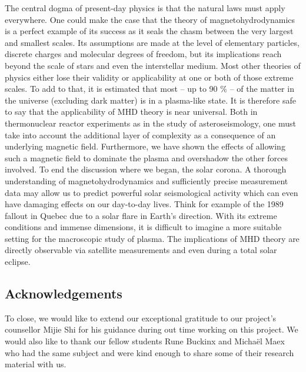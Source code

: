 The central dogma of present-day physics is that the natural laws must apply everywhere. One could make the case that the theory of magnetohydrodynamics is a perfect example of its success as it seals the chasm between the very largest and smallest scales. Its assumptions are made at the level of elementary particles, discrete charges and molecular degrees of freedom, but its implications reach beyond the scale of stars and even the interstellar medium. Most other theories of physics either lose their validity or applicability at one or both of those extreme scales.
To add to that, it is estimated that most – up to 90 $\%$ \citep{notes-principles-MHD}– of the matter in the universe (excluding dark matter) is in a plasma-like state. It is therefore safe to say that the applicability of MHD theory is near universal. Both in thermonuclear reactor experiments as in the study of asteroseismology, one must take into account the additional layer of complexity as a consequence of an underlying magnetic field. Furthermore, we have shown the effects of allowing such a magnetic field to dominate the plasma and overshadow the other forces involved. 
To end the discussion where we began, the solar corona. A thorough understanding of magnetohydrodynamics and sufficiently precise measurement data may allow us to predict powerful solar seismological activity which can even have damaging effects on our day-to-day lives. Think for example of the 1989 fallout in Quebec due to a solar flare in Earth’s direction. With its extreme conditions and immense dimensions, it is difficult to imagine a more suitable setting for the macroscopic study of plasma. The implications of MHD theory are directly observable via satellite measurements and even during a total solar eclipse. 

\subsection*{Acknowledgements}
To close, we would like to extend our exceptional gratitude to our project’s counsellor Mijie Shi for his guidance during out time working on this project. We would also like to thank our fellow students Rune Buckinx and Michaël Maex who had the same subject and were kind enough to share some of their research material with us.
